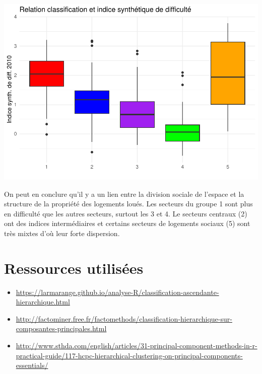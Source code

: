 \documentclass[
]{book}
\begin{document}
\includegraphics{manuel_geo_quanti_files/figure-latex/unnamed-chunk-112-1.pdf}

On peut en conclure qu'il y a un lien entre la division sociale de l'espace et la structure de la propriété des logements loués. Les secteurs du groupe 1 sont plus en difficulté que les autres secteurs, surtout les 3 et 4. Le secteurs centraux (2) ont des indices intermédiaires et certains secteurs de logements sociaux (5) sont très mixtes d'où leur forte dispersion.

\hypertarget{ressources-utilisuxe9es-1}{%
\section{Ressources utilisées}\label{ressources-utilisuxe9es-1}}

\begin{itemize}
\item
  \url{https://larmarange.github.io/analyse-R/classification-ascendante-hierarchique.html}
\item
  \url{http://factominer.free.fr/factomethods/classification-hierarchique-sur-composantes-principales.html}
\item
  \url{http://www.sthda.com/english/articles/31-principal-component-methods-in-r-practical-guide/117-hcpc-hierarchical-clustering-on-principal-components-essentials/}
\end{itemize}

  
\end{document}
